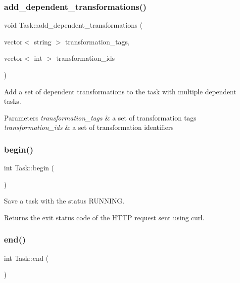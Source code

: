 \subsubsection{\texorpdfstring{add\+\_\+dependent\+\_\+transformations()}{add\_dependent\_transformations()}\hspace{0.1cm}{\footnotesize\ttfamily [2/2]}}
{\footnotesize\ttfamily void Task\+::add\+\_\+dependent\+\_\+transformations (\begin{DoxyParamCaption}\item[{vector$<$ string $>$}]{transformation\+\_\+tags,  }\item[{vector$<$ int $>$}]{transformation\+\_\+ids }\end{DoxyParamCaption})}

Add a set of dependent transformations to the task with multiple dependent tasks. 
\begin{DoxyParams}{Parameters}
{\em transformation\+\_\+tags} & a set of transformation tags \\
\hline
{\em transformation\+\_\+ids} & a set of transformation identifiers \\
\hline
\end{DoxyParams}
\mbox{\label{classTask_a8cb9bc9ccfc534b6cdd42edf15bad98e}} 
\subsubsection{\texorpdfstring{begin()}{begin()}}
{\footnotesize\ttfamily int Task\+::begin (\begin{DoxyParamCaption}{ }\end{DoxyParamCaption})}

Save a task with the status R\+U\+N\+N\+I\+NG. \begin{DoxyReturn}{Returns}
the exit status code of the H\+T\+TP request sent using curl. 
\end{DoxyReturn}
\mbox{\label{classTask_ad6acbe7ba8643e046513bf8d66e5f578}} 
\subsubsection{\texorpdfstring{end()}{end()}}
{\footnotesize\ttfamily int Task\+::end (\begin{DoxyParamCaption}{ }\end{DoxyParamCaption})}

